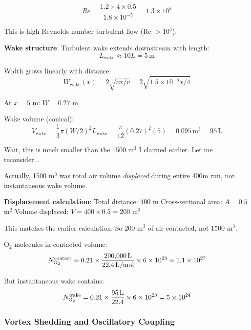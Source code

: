 \documentclass[11pt,onecolumn]{article}
\begin{document}
\begin{equation}
Re = \frac{1.2 \times 4 \times 0.5}{1.8 \times 10^{-5}} = 1.3 \times 10^5
\end{equation}

This is high Reynolds number turbulent flow (Re $> 10^4$).

\textbf{Wake structure}:
Turbulent wake extends downstream with length:
\begin{equation}
L_{\text{wake}} \approx 10L = 5\,\text{m}
\end{equation}

Width grows linearly with distance:
\begin{equation}
W_{\text{wake}}(x) = 2\sqrt{\nu x / v} = 2\sqrt{1.5 \times 10^{-5} x / 4}
\end{equation}

At $x = 5$ m: $W = 0.27$ m

Wake volume (conical):
\begin{equation}
V_{\text{wake}} = \frac{1}{3}\pi (W/2)^2 L_{\text{wake}} = \frac{\pi}{12}(0.27)^2(5) = 0.095\,\text{m}^3 = 95\,\text{L}
\end{equation}

Wait, this is much smaller than the 1500 m$^3$ I claimed earlier. Let me reconsider...

Actually, 1500 m$^3$ was total air volume \textit{displaced} during entire 400m run, not instantaneous wake volume.

\textbf{Displacement calculation}:
Total distance: 400 m
Cross-sectional area: $A = 0.5$ m$^2$
Volume displaced: $V = 400 \times 0.5 = 200$ m$^3$

This matches the earlier calculation. So 200 m$^3$ of air contacted, not 1500 m$^3$.

O$_2$ molecules in contacted volume:
\begin{equation}
N_{\ce{O2}}^{\text{contact}} = 0.21 \times \frac{200{,}000\,\text{L}}{22.4\,\text{L/mol}} \times 6 \times 10^{23} = 1.1 \times 10^{27}
\end{equation}

But instantaneous wake contains:
\begin{equation}
N_{\ce{O2}}^{\text{wake}} = 0.21 \times \frac{95\,\text{L}}{22.4} \times 6 \times 10^{23} = 5 \times 10^{24}
\end{equation}

\subsubsection{Vortex Shedding and Oscillatory Coupling}
\end{document}
